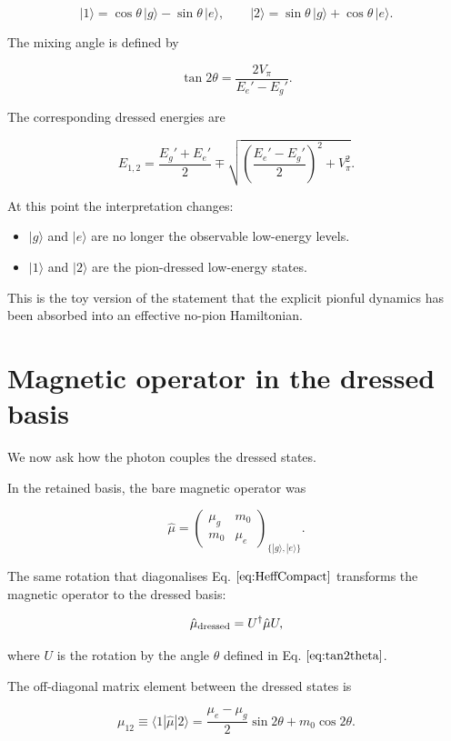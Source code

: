 \documentclass[
]{article}
\renewcommand{\[}{\begin{equation}}
\renewcommand{\]}{\end{equation}}
\providecommand{\tightlist}{%
  \setlength{\itemsep}{0pt}\setlength{\parskip}{0pt}}
\begin{document}
\[
|1\rangle =
\cos\theta\,|g\rangle -
\sin\theta\,|e\rangle,
\qquad
|2\rangle =
\sin\theta\,|g\rangle
+
\cos\theta\,|e\rangle.
\label{eq:dressedStates}
\]

The mixing angle is defined by

\[
\tan 2\theta = \frac{2V_\pi}{E_e' - E_g'}.
\label{eq:tan2theta}
\]

The corresponding dressed energies are

\[
E_{1,2} =
\frac{E_g' + E_e'}{2}
\mp
\sqrt{
\left(
\frac{E_e' - E_g'}{2}
\right)^2
+
V_\pi^2
}.
\label{eq:dressedEnergies}
\]

At this point the interpretation changes:

\begin{itemize}
\tightlist
\item
  \(|g\rangle\) and \(|e\rangle\) are no longer the observable
  low-energy levels.
\item
  \(|1\rangle\) and \(|2\rangle\) are the pion-dressed low-energy
  states.
\end{itemize}

This is the toy version of the statement that the explicit pionful
dynamics has been absorbed into an effective no-pion Hamiltonian.

\section{Magnetic operator in the dressed
basis}\label{magnetic-operator-in-the-dressed-basis}

We now ask how the photon couples the dressed states.

In the retained basis, the bare magnetic operator was

\[
\hat\mu =
\begin{pmatrix}
\mu_g & m_0 \\
m_0 & \mu_e
\end{pmatrix}_{\{|g\rangle,|e\rangle\}}.
\label{eq:muBareMatrix}
\]

The same rotation that diagonalises Eq. \(\ref{eq:HeffCompact}\)
transforms the magnetic operator to the dressed basis:

\[
\hat\mu_{\rm dressed} = U^\dagger \hat\mu U,
\label{eq:muDressedDef}
\]

where \(U\) is the rotation by the angle \(\theta\) defined in Eq.
\(\ref{eq:tan2theta}\).

The off-diagonal matrix element between the dressed states is

\[
\mu_{12}
\equiv
\langle 1|\hat\mu|2\rangle =
\frac{\mu_e-\mu_g}{2}\sin 2\theta
+
m_0 \cos 2\theta.
\label{eq:mu12general}
\]
\end{document}
